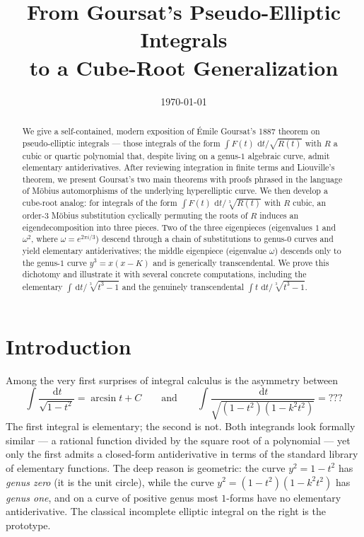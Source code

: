 \documentclass[11pt,a4paper]{article}
\title{\textbf{From Goursat's Pseudo-Elliptic Integrals\\
to a Cube-Root Generalization}}
\author{}
\date{\today}
\theoremstyle{plain}
\theoremstyle{definition}
\theoremstyle{remark}
\renewcommand{\d}{\,\mathrm{d}}
\begin{document}
\maketitle

\begin{abstract}
We give a self-contained, modern exposition of \'Emile Goursat's 1887 theorem on pseudo-elliptic integrals --- those integrals of the form $\int F(t)\,\d t/\sqrt{R(t)}$ with $R$ a cubic or quartic polynomial that, despite living on a genus-$1$ algebraic curve, admit elementary antiderivatives. After reviewing integration in finite terms and Liouville's theorem, we present Goursat's two main theorems with proofs phrased in the language of M\"obius automorphisms of the underlying hyperelliptic curve. We then develop a cube-root analog: for integrals of the form $\int F(t)\,\d t/\sqrt[3]{R(t)}$ with $R$ cubic, an order-$3$ M\"obius substitution cyclically permuting the roots of $R$ induces an eigendecomposition into three pieces. Two of the three eigenpieces (eigenvalues $1$ and $\omega^2$, where $\omega = e^{2\pi i/3}$) descend through a chain of substitutions to genus-$0$ curves and yield elementary antiderivatives; the middle eigenpiece (eigenvalue $\omega$) descends only to the genus-$1$ curve $y^3 = x(x-K)$ and is generically transcendental. We prove this dichotomy and illustrate it with several concrete computations, including the elementary $\int \d t/\sqrt[3]{t^3-1}$ and the genuinely transcendental $\int t\,\d t/\sqrt[3]{t^3-1}$.
\end{abstract}

\tableofcontents

\section{Introduction}
\label{sec:intro}

Among the very first surprises of integral calculus is the asymmetry between
\[
  \int \frac{\d t}{\sqrt{1-t^2}} = \arcsin t + C
\qquad\text{and}\qquad
  \int \frac{\d t}{\sqrt{(1-t^2)(1-k^2t^2)}} = ???
\]
The first integral is elementary; the second is not. Both integrands look formally similar --- a rational function divided by the square root of a polynomial --- yet only the first admits a closed-form antiderivative in terms of the standard library of elementary functions. The deep reason is geometric: the curve $y^2 = 1 - t^2$ has \emph{genus zero} (it is the unit circle), while the curve $y^2 = (1-t^2)(1-k^2 t^2)$ has \emph{genus one}, and on a curve of positive genus most $1$-forms have no elementary antiderivative. The classical incomplete elliptic integral on the right is the prototype.
\end{document}
